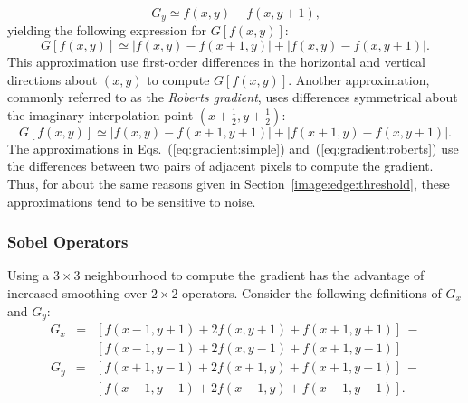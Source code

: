 \begin{equation}
  G_{y}\simeq f(x,y)-f(x,y+1)\mbox{,}
\end{equation}
yielding the following expression for $G[f(x,y)]$:
\begin{equation}
\label{eq:gradient:simple}
  G[f(x,y)]\simeq|f(x,y)-f(x+1,y)|+|f(x,y)-f(x,y+1)|\mbox{.}
\end{equation}
This approximation use first-order differences in the horizontal and
vertical directions about $(x,y)$ to compute $G[f(x,y)]$.  Another
approximation, commonly referred to as the {\em Roberts gradient\/},
uses differences symmetrical about the imaginary interpolation point
$(x+\frac{1}{2}, y+\frac{1}{2})$:
\begin{equation}
\label{eq:gradient:roberts}
  G[f(x,y)]\simeq|f(x,y)-f(x+1,y+1)|+|f(x+1,y)-f(x,y+1)|\mbox{.}
\end{equation}
The approximations in Eqs.~(\ref{eq:gradient:simple})
and~(\ref{eq:gradient:roberts}) use the differences between two pairs
of adjacent pixels to compute the gradient.  Thus, for about the same
reasons given in Section~\ref{image:edge:threshold}, these
approximations tend to be sensitive to noise.

\subsubsection{Sobel Operators}

Using a $3\times 3$ neighbourhood to compute the gradient has the
advantage of increased smoothing over $2\times 2$ operators.  Consider
the following definitions of $G_{x}$ and $G_{y}$:
\begin{equation}
\label{eq:sobel:x}
  \begin{array}{lll}
    G_{x} & = & [f(x-1,y+1)+2f(x,y+1)+f(x+1,y+1)]\ - \\
          &   & [f(x-1,y-1)+2f(x,y-1)+f(x+1,y-1)]
  \end{array}
\end{equation}
\begin{equation}
\label{eq:sobel:y}
  \begin{array}{lll}
    G_{y} & = & [f(x+1,y-1)+2f(x+1,y)+f(x+1,y+1)]\ - \\
          &   & [f(x-1,y-1)+2f(x-1,y)+f(x-1,y+1)]\mbox{.}
  \end{array}
\end{equation}


